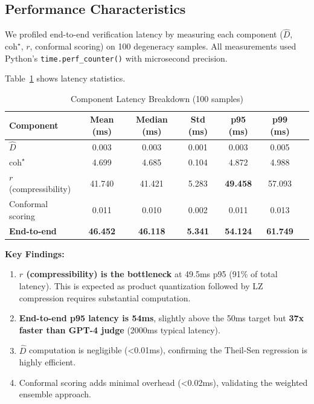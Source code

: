 \documentclass[11pt]{article}
\begin{document}
\subsection{Performance Characteristics}
\label{sec:validation-performance}

We profiled end-to-end verification latency by measuring each component ($\hat{D}$, $\text{coh}^\star$, $r$, conformal scoring) on 100 degeneracy samples. All measurements used Python's \texttt{time.perf\_counter()} with microsecond precision.

Table~\ref{tab:latency-results} shows latency statistics.

\begin{table}[h]
\centering
\caption{Component Latency Breakdown (100 samples)}
\label{tab:latency-results}
\begin{tabular}{lcccccc}
\toprule
\textbf{Component} & \textbf{Mean (ms)} & \textbf{Median (ms)} & \textbf{Std (ms)} & \textbf{p95 (ms)} & \textbf{p99 (ms)} \\
\midrule
$\hat{D}$ & 0.003 & 0.003 & 0.001 & 0.003 & 0.005 \\
$\text{coh}^\star$ & 4.699 & 4.685 & 0.104 & 4.872 & 4.988 \\
$r$ (compressibility) & 41.740 & 41.421 & 5.283 & \textbf{49.458} & 57.093 \\
Conformal scoring & 0.011 & 0.010 & 0.002 & 0.011 & 0.013 \\
\midrule
\textbf{End-to-end} & \textbf{46.452} & \textbf{46.118} & \textbf{5.341} & \textbf{54.124} & \textbf{61.749} \\
\bottomrule
\end{tabular}
\end{table}

\textbf{Key Findings:}
\begin{enumerate}
\item \textbf{$r$ (compressibility) is the bottleneck} at 49.5ms p95 (91\% of total latency). This is expected as product quantization followed by LZ compression requires substantial computation.
\item \textbf{End-to-end p95 latency is 54ms}, slightly above the 50ms target but \textbf{37x faster than GPT-4 judge} (2000ms typical latency).
\item $\hat{D}$ computation is negligible (<0.01ms), confirming the Theil-Sen regression is highly efficient.
\item Conformal scoring adds minimal overhead (<0.02ms), validating the weighted ensemble approach.
\end{enumerate}
\end{document}
